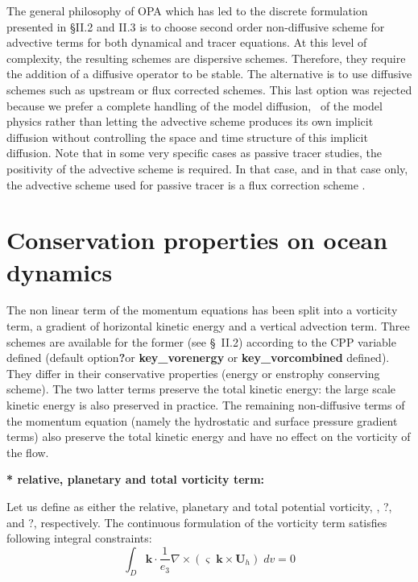 \documentclass[../main/NEMO_manual]{subfiles}
\begin{document}
The general philosophy of OPA which has led to the discrete formulation presented in {\S}II.2 and II.3 is to
choose second order non-diffusive scheme for advective terms for both dynamical and tracer equations.
At this level of complexity, the resulting schemes are dispersive schemes.
Therefore, they require the addition of a diffusive operator to be stable.
The alternative is to use diffusive schemes such as upstream or flux corrected schemes.
This last option was rejected because we prefer a complete handling of the model diffusion,
\ie\ of the model physics rather than letting the advective scheme produces its own implicit diffusion without
controlling the space and time structure of this implicit diffusion.
Note that in some very specific cases as passive tracer studies, the positivity of the advective scheme is required.
In that case, and in that case only, the advective scheme used for passive tracer is a flux correction scheme
\citep{Marti1992?, Levy1996?, Levy1998?}.

\section{Conservation properties on ocean dynamics}
\label{sec:CONS_Invariant_dyn}

The non linear term of the momentum equations has been split into a vorticity term,
a gradient of horizontal kinetic energy and a vertical advection term.
Three schemes are available for the former (see {\S}~II.2) according to the CPP variable defined
(default option\textbf{?}or \textbf{key{\_}vorenergy} or \textbf{key{\_}vorcombined} defined).
They differ in their conservative properties (energy or enstrophy conserving scheme).
The two latter terms preserve the total kinetic energy:
the large scale kinetic energy is also preserved in practice.
The remaining non-diffusive terms of the momentum equation
(namely the hydrostatic and surface pressure gradient terms) also preserve the total kinetic energy and
have no effect on the vorticity of the flow.

\textbf{* relative, planetary and total vorticity term:}

Let us define as either the relative, planetary and total potential vorticity, \ie, ?, and ?, respectively.
The continuous formulation of the vorticity term satisfies following integral constraints:
\[
  \int_D {{\textbf {k}}\cdot \frac{1}{e_3 }\nabla \times \left( {\varsigma
        \;{\mathrm {\mathbf k}}\times {\textbf {U}}_h } \right)\;dv} =0
\]
\end{document}
